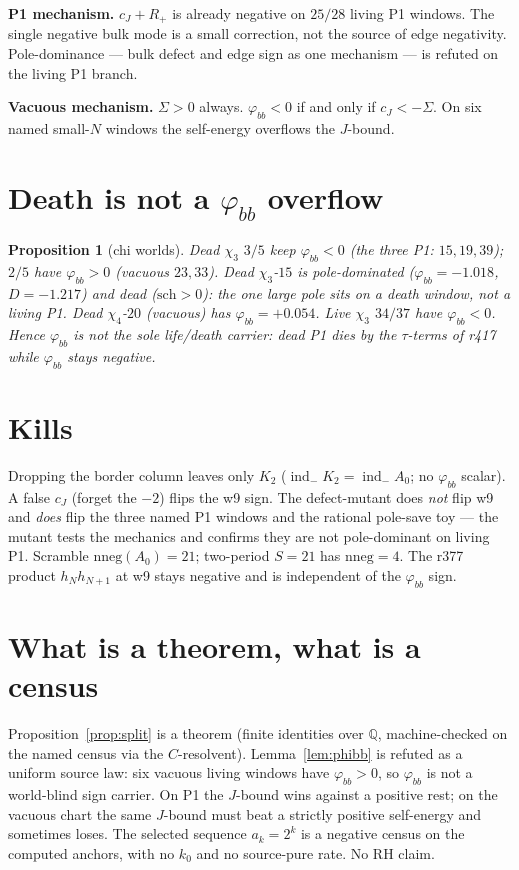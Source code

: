 \documentclass[11pt]{article}
\newtheorem{prop}{Proposition}
\theoremstyle{remark}
\newcommand{\indm}{\operatorname{ind}_{-}}
\newcommand{\phibb}{\varphi_{bb}}
\begin{document}
\noindent
\textbf{P1 mechanism.}\enspace
$c_J+R_{+}$ is already negative on $25/28$ living P1
windows.  The single negative bulk mode is a small
correction, not the source of edge negativity.
Pole-dominance --- bulk defect and edge sign as one
mechanism --- is refuted on the living P1 branch.

\noindent
\textbf{Vacuous mechanism.}\enspace
$\Sigma>0$ always.  $\phibb<0$ if and only if
$c_J<-\Sigma$.  On six named small-$N$ windows the
self-energy overflows the $J$-bound.

\section{Death is not a $\varphi_{bb}$ overflow}\label{sec:dead}

\begin{prop}[chi worlds]\label{prop:chi}
Dead $\chi_3$ $3/5$ keep $\phibb<0$ (the three P1:
$15,19,39$); $2/5$ have $\phibb>0$ (vacuous $23,33$).
Dead $\chi_3$-$15$ is pole-dominated
($\phibb=-1.018$, $D=-1.217$) \emph{and} dead
($\mathrm{sch}>0$): the one large pole sits on a
death window, not a living P1.
Dead $\chi_4$-$20$ (vacuous) has $\phibb=+0.054$.
Live $\chi_3$ $34/37$ have $\phibb<0$.
Hence $\phibb$ is not the sole life/death carrier:
dead P1 dies by the $\tau$-terms of r417 while
$\phibb$ stays negative.
\end{prop}

\section{Kills}\label{sec:kills}

Dropping the border column leaves only $K_{2}$
($\indm K_{2}=\indm A_{0}$; no $\phibb$ scalar).
A false $c_J$ (forget the $-2$) flips the w9 sign.
The defect-mutant does \emph{not} flip w9 and
\emph{does} flip the three named P1 windows and the
rational pole-save toy --- the mutant tests the
mechanics and confirms they are not pole-dominant
on living P1.
Scramble $\mathrm{nneg}(A_{0})=21$; two-period $S=21$
has $\mathrm{nneg}=4$.
The r377 product $h_Nh_{N+1}$ at w9 stays negative
and is independent of the $\phibb$ sign.

\section{What is a theorem, what is a census}\label{sec:honest}

Proposition~\ref{prop:split} is a theorem
(finite identities over $\mathbb{Q}$, machine-checked
on the named census via the $C$-resolvent).
Lemma~\ref{lem:phibb} is refuted as a uniform source
law: six vacuous living windows have $\phibb>0$, so
$\phibb$ is not a world-blind sign carrier.
On P1 the $J$-bound wins against a positive rest;
on the vacuous chart the same $J$-bound must beat a
strictly positive self-energy and sometimes loses.
The selected sequence $a_k=2^k$ is a negative census
on the computed anchors, with no $k_{0}$ and no
source-pure rate.
No RH claim.
\end{document}
